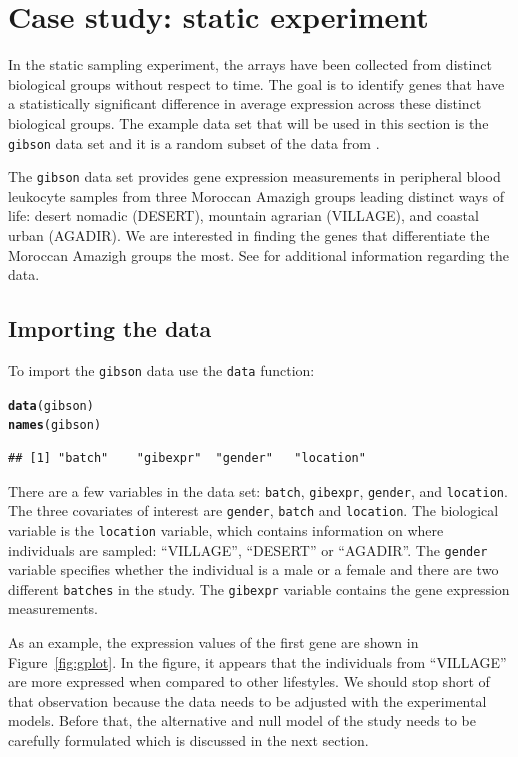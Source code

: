 \documentclass{article}\usepackage[]{graphicx}\usepackage[]{color}
\makeatletter
\newcommand{\hlstd}[1]{\textcolor[rgb]{0.345,0.345,0.345}{#1}}%
\newcommand{\hlkwd}[1]{\textcolor[rgb]{0.737,0.353,0.396}{\textbf{#1}}}%
\newenvironment{kframe}{%
 \def\at@end@of@kframe{}%
 \ifinner\ifhmode%
  \def\at@end@of@kframe{\end{minipage}}%
  \begin{minipage}{\columnwidth}%
 \fi\fi%
 \def\FrameCommand##1{\hskip\@totalleftmargin \hskip-\fboxsep
 \colorbox{shadecolor}{##1}\hskip-\fboxsep
     \hskip-\linewidth \hskip-\@totalleftmargin \hskip\columnwidth}%
 \MakeFramed {\advance\hsize-\width
   \@totalleftmargin\z@ \linewidth\hsize
   \@setminipage}}%
 {\par\unskip\endMakeFramed%
 \at@end@of@kframe}
\newenvironment{knitrout}{}{} %
\makeatother
\begin{document}
\section{Case study: static experiment}
\label{sec:gibson}
In the static sampling experiment, the arrays have been collected from distinct biological groups without respect to time. The goal is to identify genes that have a statistically significant difference in average expression across these distinct biological groups. The example data set that will be used in this section is the {\tt gibson} data set and it is a random subset of the data from \cite{gibson:2008}.

The {\tt gibson} data set provides gene expression measurements in peripheral blood leukocyte samples from three Moroccan Amazigh groups leading distinct ways of life: desert nomadic (DESERT), mountain agrarian (VILLAGE), and coastal urban (AGADIR). We are interested in finding the genes that differentiate the Moroccan Amazigh groups the most. See \cite{gibson:2008} for additional information regarding the data.

\subsection{Importing the data}
To import the {\tt gibson} data use the {\tt data} function:
\begin{knitrout}
\color{fgcolor}\begin{kframe}
\begin{alltt}
\hlkwd{data}\hlstd{(gibson)}
\hlkwd{names}\hlstd{(gibson)}
\end{alltt}
\begin{verbatim}
## [1] "batch"    "gibexpr"  "gender"   "location"
\end{verbatim}
\end{kframe}
\end{knitrout}
There are a few variables in the data set: {\tt batch}, {\tt gibexpr}, {\tt gender}, and {\tt location}. The three covariates of interest are {\tt gender}, {\tt batch} and {\tt location}. The biological variable is the {\tt location} variable, which contains information on where individuals are sampled: ``VILLAGE'', ``DESERT'' or ``AGADIR''. The {\tt gender} variable specifies whether the individual is a male or a female and there are two different {\tt batches} in the study. The {\tt gibexpr} variable contains the gene expression measurements. 

As an example, the expression values of the first gene are shown in Figure~\ref{fig:gplot}. In the figure, it appears that the individuals from ``VILLAGE'' are more expressed when compared to other lifestyles. We should stop short of that observation because the data needs to be adjusted with the experimental models. Before that, the alternative and null model of the study needs to be carefully formulated which is discussed in the next section.
\end{document}
